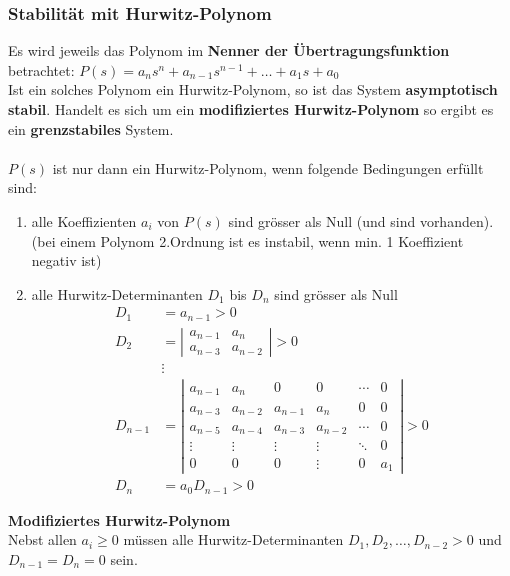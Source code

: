 \subsubsection{Stabilität mit Hurwitz-Polynom }
Es wird jeweils das Polynom im \textbf{Nenner der Übertragungsfunktion} betrachtet:
$P(s) = a_n s^n + a_{n-1} s^{n-1} +\ldots +a_1s + a_0$ \\
Ist ein solches Polynom ein Hurwitz-Polynom, so ist das System \textbf{asymptotisch stabil}.
Handelt es sich um ein \textbf{modifiziertes Hurwitz-Polynom} so ergibt es ein
\textbf{grenzstabiles} System.\\ \\
$P(s)$ ist nur dann ein Hurwitz-Polynom, wenn folgende Bedingungen erfüllt sind:
\begin{enumerate}
	\item	alle Koeffizienten $a_i$ von $P(s)$ sind grösser als Null (und sind vorhanden).\\
				(bei einem Polynom 2.Ordnung ist es instabil, wenn min. 1 Koeffizient negativ ist)
	\item	alle Hurwitz-Determinanten $D_1$ bis $D_n$ sind grösser als Null\\
				\begin{align}
					D_1 &= a_{n-1} > 0 \nonumber\\
					D_2 &= \left|
						\begin{matrix}
							a_{n-1} & a_n\\
							a_{n-3} & a_{n-2}
						\end{matrix}\right| > 0 \nonumber \\
						&\vdots \nonumber \\
					D_{n-1} &= \left|
						\begin{matrix}
							a_{n-1} & a_n & 0 & 0 & \cdots & 0 \\
							a_{n-3} & a_{n-2} & a_{n-1} & a_n & 0 & 0 \\
							a_{n-5} & a_{n-4} & a_{n-3} & a_{n-2} & \cdots & 0 \\
							\vdots & \vdots & \vdots & \vdots & \ddots & 0 \\
							0 & 0 & 0 & \vdots & 0 & a_1
						\end{matrix}\right| > 0 \nonumber \\
					D_n &= a_0D_{n-1} > 0 \nonumber
				\end{align}
\end{enumerate}

\textbf{Modifiziertes Hurwitz-Polynom}\\
Nebst allen $a_i \geq 0$ müssen alle Hurwitz-Determinanten $D_1, D_2, \ldots, D_{n-2} > 0$
und $D_{n-1} = D_n = 0$ sein. \\


